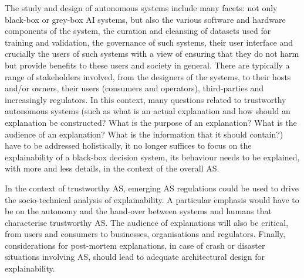 \documentclass[sigconf,nonacm]{acmart}%
\begin{document}
	The study and design of autonomous systems include many facets: not only black-box or grey-box AI systems, but also the various software and hardware components of the system, the curation and cleansing of datasets used for training and validation, the governance of such systems, their user interface and crucially the users of such systems with a view of ensuring that they do not harm but provide benefits to these users and society in general. There are typically a range of stakeholders involved, from the designers of the systems, to their hosts and/or owners, their users (consumers and operators), third-parties and increasingly regulators. In this context, many questions related to trustworthy autonomous systems (such as what is an actual explanation and how should an explanation be constructed? What is the purpose of an explanation? What is the audience of an explanation? What is the information that it should contain?) have to be addressed holistically, it no longer suffices to focus on the explainability of a black-box decision system, its behaviour needs to be explained, with more and less details, in the context of the overall AS.	
	
	In the context of trustworthy AS, emerging AS regulations could be used to drive the socio-technical analysis of explainability. A particular emphasis would have to be on the autonomy and the hand-over between systems and humans that characterise trustworthy AS. The audience of explanations will also be critical, from users and consumers to businesses, organisations and regulators. Finally, considerations for post-mortem explanations, in case of crash or disaster situations involving AS, should lead to adequate architectural design for explainability.
	
	
\end{document}
